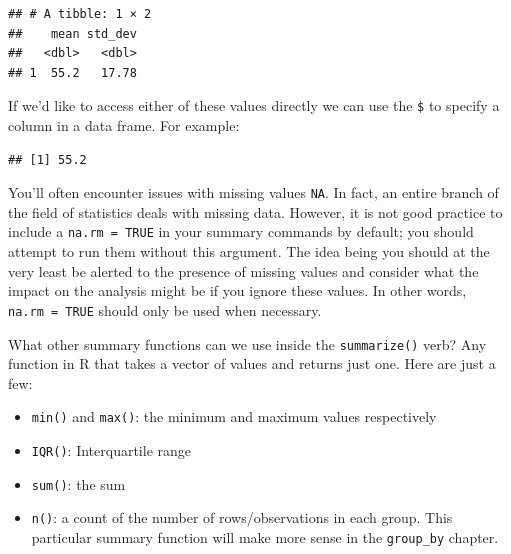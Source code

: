 \documentclass[]{tufte-book}
\newenvironment{Shaded}{\begin{snugshade}}{\end{snugshade}}
\newcommand{\KeywordTok}[1]{\textcolor[rgb]{0.13,0.29,0.53}{\textbf{{#1}}}}
\newcommand{\DataTypeTok}[1]{\textcolor[rgb]{0.13,0.29,0.53}{{#1}}}
\newcommand{\StringTok}[1]{\textcolor[rgb]{0.31,0.60,0.02}{{#1}}}
\newcommand{\OtherTok}[1]{\textcolor[rgb]{0.56,0.35,0.01}{{#1}}}
\newcommand{\NormalTok}[1]{{#1}}
\providecommand{\tightlist}{%
  \setlength{\itemsep}{0pt}\setlength{\parskip}{0pt}}
\begin{document}
\begin{Shaded}
\end{Shaded}

\begin{verbatim}
## # A tibble: 1 × 2
##    mean std_dev
##   <dbl>   <dbl>
## 1  55.2   17.78
\end{verbatim}

If we'd like to access either of these values directly we can use the
\texttt{\$} to specify a column in a data frame. For example:

\begin{Shaded}
\end{Shaded}

\begin{verbatim}
## [1] 55.2
\end{verbatim}

You'll often encounter issues with missing values \texttt{NA}. In fact,
an entire branch of the field of statistics deals with missing data.
However, it is not good practice to include a \texttt{na.rm\ =\ TRUE} in
your summary commands by default; you should attempt to run them without
this argument. The idea being you should at the very least be alerted to
the presence of missing values and consider what the impact on the
analysis might be if you ignore these values. In other words,
\texttt{na.rm\ =\ TRUE} should only be used when necessary.

What other summary functions can we use inside the \texttt{summarize()}
verb? Any function in R that takes a vector of values and returns just
one. Here are just a few:

\begin{itemize}
\tightlist
\item
  \texttt{min()} and \texttt{max()}: the minimum and maximum values
  respectively
\item
  \texttt{IQR()}: Interquartile range
\item
  \texttt{sum()}: the sum
\item
  \texttt{n()}: a count of the number of rows/observations in each
  group. This particular summary function will make more sense in the
  \texttt{group\_by} chapter.
\end{itemize}
\end{document}
